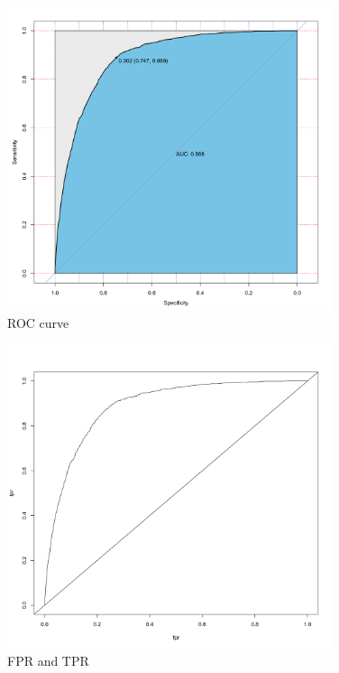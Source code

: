 \documentclass{article}
\begin{document}
\begin{figure}[H]
    \centering
    \caption{ROC curve}
    \includegraphics[width=0.85\textwidth]{Fig2}
\end{figure}

\begin{figure}[H]
    \centering
    \caption{FPR and TPR}
    \includegraphics[width=0.85\textwidth]{Fig1}
\end{figure}
\end{document}
